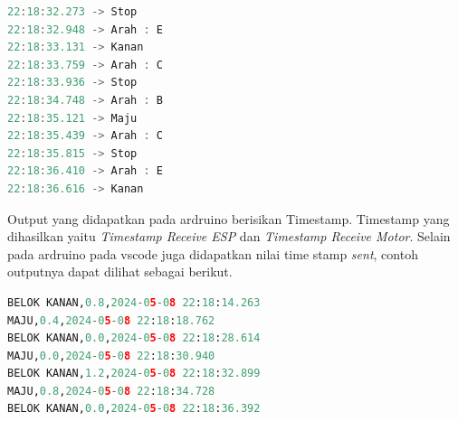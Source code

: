 \begin{lstlisting}[language=c]
22:18:32.273 -> Stop
22:18:32.948 -> Arah : E
22:18:33.131 -> Kanan
22:18:33.759 -> Arah : C
22:18:33.936 -> Stop
22:18:34.748 -> Arah : B
22:18:35.121 -> Maju
22:18:35.439 -> Arah : C
22:18:35.815 -> Stop
22:18:36.410 -> Arah : E
22:18:36.616 -> Kanan
\end{lstlisting}


Output yang didapatkan pada ardruino berisikan Timestamp. Timestamp yang dihasilkan yaitu \emph{Timestamp Receive ESP} dan \emph{Timestamp Receive Motor}. Selain pada ardruino pada vscode juga didapatkan nilai time stamp \emph{sent}, contoh outputnya dapat dilihat sebagai berikut.

\begin{lstlisting}[language=python]
BELOK KANAN,0.8,2024-05-08 22:18:14.263
MAJU,0.4,2024-05-08 22:18:18.762
BELOK KANAN,0.0,2024-05-08 22:18:28.614
MAJU,0.0,2024-05-08 22:18:30.940
BELOK KANAN,1.2,2024-05-08 22:18:32.899
MAJU,0.8,2024-05-08 22:18:34.728
BELOK KANAN,0.0,2024-05-08 22:18:36.392
\end{lstlisting}

